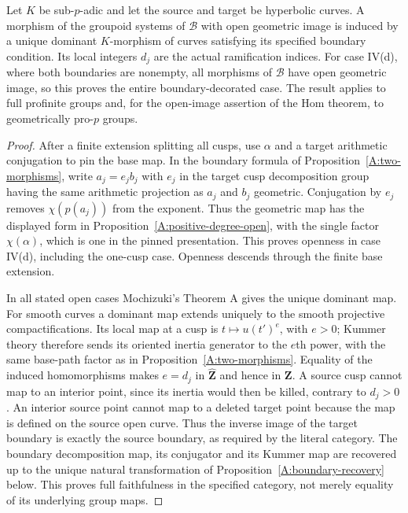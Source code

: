 \begin{proposition}
\label{A:relative-hom}
Let $K$ be sub-$p$-adic and let the source and target
be hyperbolic curves.  A morphism of the groupoid
systems of $\mathcal B$ with open geometric image is
induced by a unique dominant $K$-morphism of curves
satisfying its specified boundary condition.  Its local
integers $d_j$ are the actual ramification indices.
For case IV(d), where both boundaries are nonempty,
all morphisms of $\mathcal B$ have open geometric
image, so this proves the entire boundary-decorated
case.  The result applies to full profinite groups and,
for the open-image assertion of the Hom theorem, to
geometrically pro-$p$ groups.
\end{proposition}
\begin{proof}
After a finite extension splitting all cusps, use
$\alpha$ and a target arithmetic conjugation to pin the
base map.  In the boundary formula of
Proposition~\ref{A:two-morphisms}, write
$a_j=e_jb_j$ with $e_j$ in the target cusp decomposition
group having the same arithmetic projection as $a_j$
and $b_j$ geometric.  Conjugation by $e_j$ removes
$\chi(p(a_j))$ from the exponent.  Thus the geometric
map has the displayed form in
Proposition~\ref{A:positive-degree-open}, with the
single factor $\chi(\alpha)$, which is one in the
pinned presentation.  This proves openness in case
IV(d), including the one-cusp case.  Openness descends
through the finite base extension.

In all stated open cases Mochizuki's Theorem A
\cite{A_Mochizuki1999} gives the unique dominant map.
For smooth curves a dominant map extends uniquely to
the smooth projective compactifications.  Its local
map at a cusp is $t\mapsto u(t')^e$, with $e>0$;
Kummer theory therefore sends its oriented inertia
generator to the $e$th power, with the same base-path
factor as in Proposition~\ref{A:two-morphisms}.
Equality of the induced homomorphisms makes $e=d_j$
in $\widehat{\mathbf Z}$ and hence in $\mathbf Z$.
A source cusp cannot map to an interior point, since
its inertia would then be killed, contrary to $d_j>0$.
An interior source point cannot map to a deleted target
point because the map is defined on the source open
curve.  Thus the inverse image of the target boundary
is exactly the source boundary, as required by the
literal category.  The boundary decomposition map,
its conjugator and its Kummer map are recovered up to
the unique natural transformation of
Proposition~\ref{A:boundary-recovery} below.  This
proves full faithfulness in the specified category,
not merely equality of its underlying group maps.
\end{proof}

